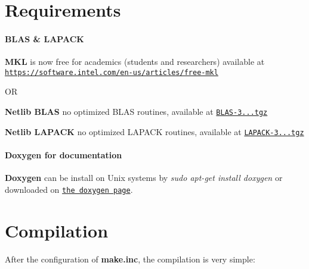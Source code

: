 \section*{Requirements }

\paragraph*{B\+L\+AS \& L\+A\+P\+A\+CK}


\begin{DoxyItemize}
\item {\bfseries M\+KL} is now free for academics (students and researchers) available at \href{https://software.intel.com/en-us/articles/free-mkl}{\tt https\+://software.\+intel.\+com/en-\/us/articles/free-\/mkl}
\end{DoxyItemize}

OR


\begin{DoxyItemize}
\item {\bfseries Netlib B\+L\+AS} no optimized B\+L\+AS routines, available at \href{http://www.netlib.org/blas/blas-3.8.0.tgz}{\tt B\+L\+A\+S-\/3...\+tgz}
\item {\bfseries Netlib L\+A\+P\+A\+CK} no optimized L\+A\+P\+A\+CK routines, available at \href{http://www.netlib.org/lapack/lapack-3.8.0.tar.gz}{\tt L\+A\+P\+A\+C\+K-\/3...\+tgz}
\end{DoxyItemize}

\paragraph*{Doxygen for documentation}


\begin{DoxyItemize}
\item {\bfseries Doxygen} can be install on Unix systems by {\itshape sudo apt-\/get install doxygen} or downloaded on \href{http://www.doxygen.org/download.html}{\tt the doxygen page}.
\end{DoxyItemize}

\section*{Compilation }

After the configuration of {\bfseries make.\+inc}, the compilation is very simple\+:


